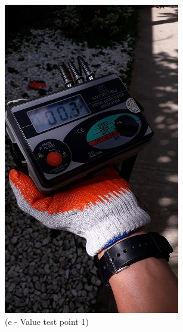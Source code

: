 \begin{figure}
\begin{minipage}[b]{0.22\linewidth}
	\includegraphics[width=\textwidth]{figures/R1P_grounding/reading1.jpg}
	\caption*{(e - Value test point 1)}
\end{minipage}
\hspace{0.03cm}
\begin{minipage}[b]{0.22\linewidth}
	\centering

\end{minipage}
\end{figure}
